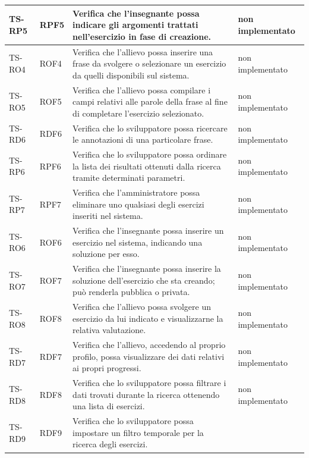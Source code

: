 \begin{longtable}{|>{\centering\arraybackslash}m{1.6cm}|>{\centering\arraybackslash}m{1.7cm}|m{6.41cm}|>{\centering\arraybackslash}m{3.1cm}|}
		\rowcolor{LightGray}
		TS-RP5		
		& RPF5 
		& Verifica che l'insegnante possa indicare gli argomenti trattati nell'esercizio in fase di creazione.
		& non implementato\\ \hline
		\rowcolor{white}
		TS-RO4		
		& ROF4 
		& Verifica che l'allievo possa inserire una frase da svolgere o selezionare un esercizio da quelli disponibili sul sistema.
		& non implementato\\ \hline
		\rowcolor{LightGray}
		TS-RO5		
		& ROF5 
		& Verifica che l'allievo possa compilare i campi relativi alle parole della frase al fine di completare l'esercizio selezionato.
		& non implementato\\ \hline
		\rowcolor{white}
		TS-RD6		
		& RDF6 
		& Verifica che lo sviluppatore possa ricercare le annotazioni di una particolare frase.
		& non implementato\\ \hline
		\rowcolor{LightGray}
		TS-RP6		
		& RPF6 
		& Verifica che lo sviluppatore possa ordinare la lista dei risultati ottenuti dalla ricerca tramite determinati parametri. 
		& non implementato\\ \hline
		\rowcolor{white}
		TS-RP7		
		& RPF7 
		& Verifica che l'amministratore possa eliminare uno qualsiasi degli esercizi inseriti nel sistema.
		& non implementato\\ \hline
		\rowcolor{LightGray}
		TS-RO6		
		& ROF6 
		& Verifica che l'insegnante possa inserire un esercizio nel sistema, indicando una soluzione per esso. 
		& non implementato\\ \hline
		\rowcolor{white}
		TS-RO7		
		& ROF7 
		& Verifica che l'insegnante possa inserire la soluzione dell'esercizio che sta creando; può renderla pubblica o privata. 
		& non implementato\\ \hline
		\rowcolor{LightGray}
		TS-RO8		
		& ROF8 
		& Verifica che l'allievo possa svolgere un esercizio da lui indicato e visualizzarne la relativa valutazione. 
		& non implementato\\ \hline
		\rowcolor{white}
		TS-RD7		
		& RDF7 
		& Verifica che l'allievo, accedendo al proprio profilo, possa visualizzare dei dati relativi ai propri progressi. 
		& non implementato\\ \hline
		\rowcolor{LightGray}
		TS-RD8		
		& RDF8 
		& Verifica che lo sviluppatore possa filtrare i dati trovati durante la ricerca ottenendo una lista di esercizi. 
		& non implementato\\ \hline
		\rowcolor{white}
		TS-RD9
		& RDF9 
		& Verifica che lo sviluppatore possa impostare un filtro temporale per la ricerca degli esercizi.

\end{longtable}

